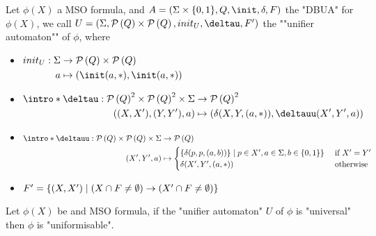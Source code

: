 \documentclass{article}
\begin{document}
\begin{definition}
	Let $\phi(X)$ a MSO formula, and $A =  (\Sigma \times \{0,1\}, Q, \init, \delta, F)$ the "DBUA" for $\phi(X)$, we call $U = (\Sigma, \parts Q \times \parts Q,init_U, \deltau, F')$
	the ""unifier automaton"" of $\phi$, where
	\begin{itemize}
		\item$\begin{aligned}[t]
				      init_U : \Sigma & \to      \parts Q \times \parts {Q} \\
				      a               & \mapsto  ( \init(a,*), \init(a,*))
			      \end{aligned}$
		\item$\begin{aligned}[t]
				      \intro*\deltau : {\parts Q}^2 \times {\parts {Q}}^2 \times \Sigma & \to    {\parts {Q}}^2                           \\
				      ((X,X'),(Y,Y'),a)                                                 & \mapsto (\delta(X,Y,(a,*)), \deltauu (X',Y',a)) \\
			      \end{aligned}$
		\item $ \begin{aligned}[t]
				      \intro*\deltauu : \parts Q \times \parts Q \times \Sigma & \to \parts Q                                                                                           \\
				      (X', Y', a)                                              & \mapsto \begin{cases}
					                                                                         \{\delta(p,p,(a,b))\}     \mid p \in X', a \in \Sigma, b \in \set{0,1}\} & \text{ if } X' = Y' \\
					                                                                         \delta(X',Y',(a,*))                                                      & \text{ otherwise}
				                                                                         \end{cases}
			      \end{aligned}$
		\item $F' = \left\{(X,X') \mid (X \cap F \neq \emptyset) \rightarrow (X' \cap F \neq \emptyset)\right\}$
	\end{itemize}
\end{definition}

\begin{lemma}
	Let $\phi(X)$ be and MSO formula, if the "unifier automaton" $U$ of $\phi$ is "universal" then $\phi$ is "uniformisable".
\end{lemma}
\end{document}

